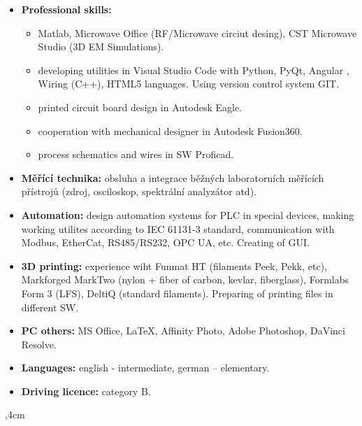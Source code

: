 \documentclass[10pt]{article}
\begin{document}
\begin{itemize}
    \item \textbf{Professional skills:} 
    \begin{itemize}
        \item Matlab, Microwave Office (RF/Microwave circiut desing), CST Microwave Studio (3D EM Simulations).
        \item developing utilities in Visual Studio Code with Python, PyQt, Angular , Wiring (C++), HTML5 languages. Using version control system GIT.
        \item printed circuit board design in Autodesk Eagle.
        \item cooperation with mechanical designer in Autodesk Fusion360.
        \item process schematics and wires in SW Proficad.
    \end{itemize}
    \item \textbf{Měřící technika:} obsluha a integrace běžných laboratorních měřících přístrojů (zdroj, osciloskop, spektrální analyzátor atd).
    \item \textbf{Automation:} design automation systems for PLC in special devices, making working utilites according to IEC 61131-3 standard, communication
    with Modbus, EtherCat, RS485/RS232, OPC UA, etc. Creating of GUI.
    \item \textbf{3D printing:} experience wiht Funmat HT (filaments Peek, Pekk, etc), Markforged MarkTwo (nylon + fiber of carbon, kevlar, fiberglass), Formlabs Form 3 (LFS), DeltiQ (standard filaments). 
    Preparing of printing files in different SW.
    \item \textbf{PC others:} MS Office, \LaTeX, Affinity Photo, Adobe Photoshop, DaVinci Resolve.
    \item \textbf{Languages:} english - intermediate, german – elementary.
    \item \textbf{Driving licence:} category B.
\end{itemize}

\noindent\hrulefill
{},4cm
\end{document}

